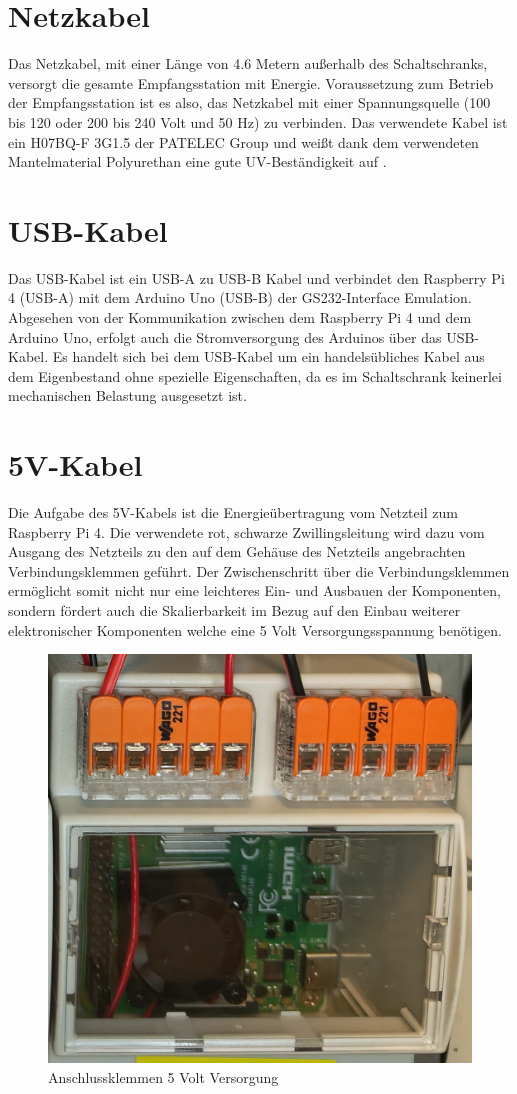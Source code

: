 \section{Netzkabel}
\label{sec:Netzkabel}
Das Netzkabel, mit einer Länge von 4.6 Metern außerhalb des Schaltschranks, versorgt die gesamte Empfangsstation mit Energie. Voraussetzung zum Betrieb der Empfangsstation ist es also, das Netzkabel mit einer Spannungsquelle (100 bis 120 oder 200 bis 240 Volt und 50 Hz) zu verbinden. Das verwendete Kabel ist ein H07BQ-F 3G1.5 der PATELEC Group \cite{noauthor_cables_nodate} und weißt dank dem verwendeten Mantelmaterial Polyurethan eine gute UV-Beständigkeit auf \cite{noauthor_polyurethan_nodate}.

\section{USB-Kabel}
\label{sec:USB-Kabel}
Das USB-Kabel ist ein USB-A zu USB-B Kabel und verbindet den Raspberry Pi 4 (USB-A) mit dem Arduino Uno (USB-B) der GS232-Interface Emulation. Abgesehen von der Kommunikation zwischen dem Raspberry Pi 4 und dem Arduino Uno, erfolgt auch die Stromversorgung des Arduinos über das USB-Kabel. Es handelt sich bei dem USB-Kabel um ein handelsübliches Kabel aus dem Eigenbestand ohne spezielle Eigenschaften, da es im Schaltschrank keinerlei mechanischen Belastung ausgesetzt ist.

\section{5V-Kabel}
\label{sec:5V-Kabel}
Die Aufgabe des 5V-Kabels ist die Energieübertragung vom Netzteil zum Raspberry Pi 4. Die verwendete rot, schwarze Zwillingsleitung wird dazu vom Ausgang des Netzteils zu den auf dem Gehäuse des Netzteils angebrachten Verbindungsklemmen geführt. Der Zwischenschritt über die Verbindungsklemmen ermöglicht somit nicht nur eine leichteres Ein- und Ausbauen der Komponenten, sondern fördert auch die Skalierbarkeit im Bezug auf den Einbau weiterer elektronischer Komponenten welche eine 5 Volt Versorgungsspannung benötigen.

\begin{figure}[H]
	\centering
	\includegraphics[width=.25\linewidth]{../ref/Anschlussklemmen5V.jpeg}
	\caption{Anschlussklemmen 5 Volt Versorgung}
	\label{fig:anschlussklemmen}
\end{figure}

